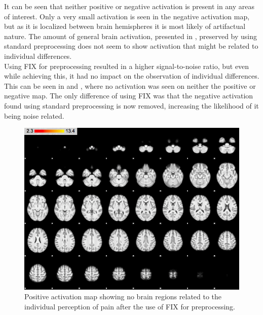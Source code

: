 It can be seen that neither positive or negative activation is present in any areas of interest. Only a very small activation is seen in the negative activation map, but as it is localized between brain hemispheres it is most likely of artifactual nature. The amount of general brain activation, presented in , preserved by using standard preprocessing does not seem to show activation that might be related to individual differences. \\
Using FIX for preprocessing resulted in a higher signal-to-noise ratio, but even while achieving this, it had no impact on the observation of individual differences. This can be seen in  and , where no activation was seen on neither the positive or negative map. The only difference of using FIX was that the negative activation found using standard preprocessing is now removed, increasing the likelihood of it being noise related. 

\begin{figure}[H]                 
	\includegraphics[width=.65\textwidth]{figures/Results/FIX_pos_ID}  
	\caption{Positive activation map showing no brain regions related to the individual perception of pain after the use of FIX for preprocessing.}
	\label{FIX_pos_ID} 
\end{figure}

